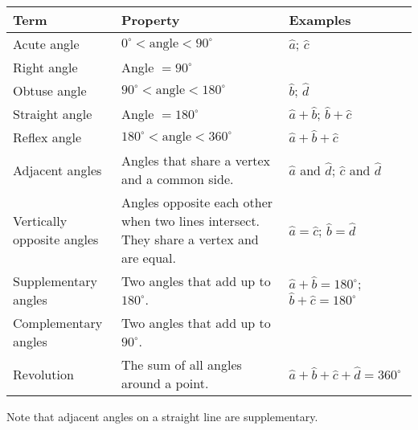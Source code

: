 \begin{table}[H]
\begin{center}
\begin{tabular}{|p{3.5cm}|p{4cm}|p{4cm}|} \hline
\textbf{Term} & \textbf{Property} & \textbf{Examples}\\ \hline
Acute angle & $0^{\circ} < \mbox{angle} < 90^{\circ}$ & $\hat{a}$; $\hat{c}$ \\ \hline
Right angle & Angle $= 90^{\circ}$ &  \\ \hline
Obtuse angle & $90^{\circ} < \mbox{angle} < 180^{\circ}$ & $\hat{b}$; $\hat{d}$ \\ \hline
Straight angle & Angle $= 180^{\circ}$ & $\hat{a} + \hat{b}$;  $\hat{b} + \hat{c}$  \\
 \hline
Reflex angle & $180^{\circ} < \mbox{angle} < 360^{\circ}$ & $\hat{a} + \hat{b} + \hat{c}$ \\ \hline
Adjacent angles & Angles that share a vertex and a common side. & $\hat{a}$ and $\hat{d}$;  $\hat{c}$ and $\hat{d}$ \\ 
 \hline
Vertically opposite angles & Angles opposite each other when two lines intersect. They share a vertex and are equal. & $\hat{a}=\hat{c}$;  $\hat{b}=\hat{d}$\\
 \hline
Supplementary angles & Two angles that add up to $180^{\circ}$. & $\hat{a}+\hat{b}=180^{\circ}$; $\hat{b}+\hat{c}=180^{\circ}$ \\ 
\hline
Complementary angles & Two angles that add up to $90^{\circ}$. & \\ \hline
Revolution & The sum of all angles around a point. &  $\hat{a}+\hat{b}+\hat{c}+\hat{d}=360^{\circ}$ \\ \hline

\end{tabular}
\end{center}
\end{table}
\par

Note that adjacent angles on a straight line are supplementary.

